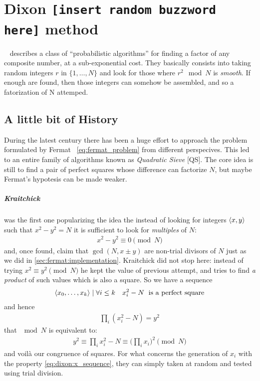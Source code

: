 \chapter{Dixon {\texttt{\small{[insert random buzzword here]}}} method\label{chap:dixon}}

~\cite{dixon} describes a class of ``probabilistic algorithms'' for finding a
factor of any composite number, at a sub-exponential cost. They basically
consists into taking random integers $r$ in $\{1, \ldots, N\}$ and look for those
where $r^2 \mod{N}$ is \emph{smooth}. If enough are found, then those integers
can somehow be assembled, and so a fatorization of N attemped.

\section{A little bit of History}
During the latest century there has been a huge effort to approach the problem
formulated by Fermat ~\ref{eq:fermat_problem} from different perspecives. This
led to an entire family of algorithms known as \emph{Quadratic Sieve} [QS]. The
core idea is still to find a pair of perfect squares whose difference can
factorize $N$, but maybe Fermat's hypotesis can be made weaker.

\paragraph{Kraitchick} was the first one popularizing the idea the instead of
looking for integers $\langle x, y\rangle$ such that $x^2 -y^2 = N$ it is sufficient
to look for \emph{multiples} of $N$:
\begin{align}
  x^2 - y^2 \equiv 0 \pmod{N}
\end{align}
and, once found, claim that $\gcd(N, x \pm y)$ are non-trial divisors of $N$
just as we did in \ref{sec:fermat:implementation}.
Kraitchick did not stop here: instead of trying $x^2 \equiv y^2 \pmod{N}$ he
kept the value of previous attempt, and tries to find \emph{a product} of such
values which is also a square. So we have a sequence
\begin{align}
  \label{eq:dixon:x_sequence}
  \langle x_0, \ldots, x_k\rangle \mid \forall i \leq k \quad x_i^2 - N
  \; \text{ is a perfect square}
\end{align}
and hence
\begin{align*}
  \prod_i (x_i^2 - N) = y^2
\end{align*}
that $\mod{N}$ is equivalent to:
\begin{align}
  \label{eq:dixon:fermat_revisited}
  y^2 \equiv \prod_i x_i^2 - N \equiv \big( \prod_i x_i \big) ^2 \pmod{N}
\end{align}
and voil\`a our congruence of squares. For what concerns the generation of $x_i$
with the property \ref{eq:dixon:x_sequence}, they can simply taken at random and
tested using trial division.

